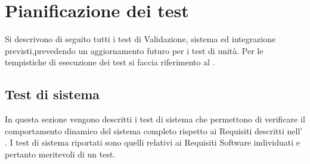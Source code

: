 \section{Pianificazione dei test}{
Si descrivono di seguito tutti i test di Validazione, sistema ed integrazione previsti,prevedendo un aggiornamento futuro per i test di unità. Per le tempistiche di esecuzione
dei test si faccia riferimento al  \href{run:../../Esterni/\fPianoDiProgetto}{\fEscapePianoDiProgetto}.
\subsection{Test di sistema}{
In questa sezione vengono descritti i test di sistema che permettono di verificare il
comportamento dinamico del sistema completo rispetto ai Requisiti descritti nell’ \href{run:../../Esterni/\fAnalisiDeiRequisiti}{\fEscapeAnalisiDeiRequisiti}.
	I test di sistema riportati sono quelli relativi ai Requisiti Software individuati e pertanto
	meritevoli di un test.
	
}}
